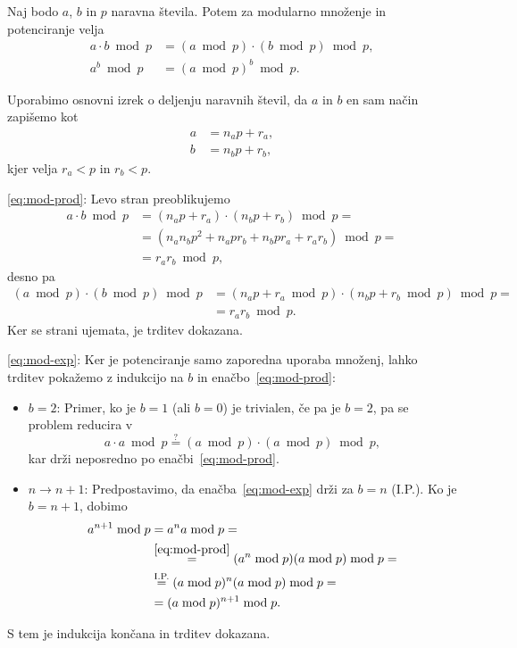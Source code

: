 \documentclass[isrm2, tisk]{fmfdelo}
\begin{document}
\begin{trditev}
\label{trd:mod-mn-pt}
    Naj bodo $a$, $b$ in $p$ naravna števila. Potem za modularno množenje in potenciranje velja
    \begin{align}
        a \cdot b \bmod p &= (a \bmod p) \cdot (b \bmod p) \bmod p, \label{eq:mod-prod} \\
        a^b \bmod p &= (a \bmod p)^b \bmod p. \label{eq:mod-exp} 
    \end{align}
\end{trditev}
\begin{dokaz}
    Uporabimo osnovni izrek o deljenju naravnih števil, da $a$ in $b$ en sam način zapišemo kot 
    \begin{align*}
        a &= n_a p + r_a, \\
        b &= n_b p + r_b,
    \end{align*}
    kjer velja $r_a < p$ in $r_b < p$.

    \eqref{eq:mod-prod}: Levo stran preoblikujemo
    \begin{align*}
        a \cdot b \bmod p &= (n_a p + r_a) \cdot (n_b p + r_b) \bmod p = \\
                          &= (n_a n_b p^2 + n_a p r_b + n_b p r_a + r_a r_b) \bmod p = \\
                          &= r_a r_b \bmod p,
    \end{align*}
    desno pa
    \begin{align*}
        (a \bmod p) \cdot (b \bmod p) \bmod p &= (n_a p + r_a \bmod p) \cdot (n_b p + r_b \bmod p) \bmod p = \\
                          &= r_a r_b \bmod p.
    \end{align*}
    Ker se strani ujemata, je trditev dokazana.

    \eqref{eq:mod-exp}: Ker je potenciranje samo zaporedna uporaba množenj, lahko trditev pokažemo z 
    indukcijo na $b$ in enačbo~\eqref{eq:mod-prod}:
    \begin{itemize}
        \item $b = 2$: Primer, ko je $b = 1$ (ali $b = 0$) je trivialen, če pa je $b = 2$, pa se 
            problem reducira v 
            $$ 
            a \cdot a \bmod p \stackrel{?}{=} (a \bmod p) \cdot (a \bmod p) \bmod p,
            $$
            kar drži neposredno po enačbi~\eqref{eq:mod-prod}.
        \item $n \rightarrow n + 1$: Predpostavimo, da enačba~\eqref{eq:mod-exp} drži za $b = n$ (I.P.). 
            Ko je $b = n + 1$, dobimo 
            \begin{align*}
                a^{n + 1} \bmod p &= a^n a \bmod p = \\ 
                                  &\stackrel{\eqref{eq:mod-prod}}{=} (a^n \bmod p) (a \bmod p) \bmod p = \\
                                  &\stackrel{\text{I.P.}}{=} (a \bmod p)^n (a \bmod p) \bmod p = \\
                                  &= (a \bmod p)^{n + 1} \bmod p.
            \end{align*}
    \end{itemize}
    S tem je indukcija končana in trditev dokazana.
\end{dokaz}
\end{document}
